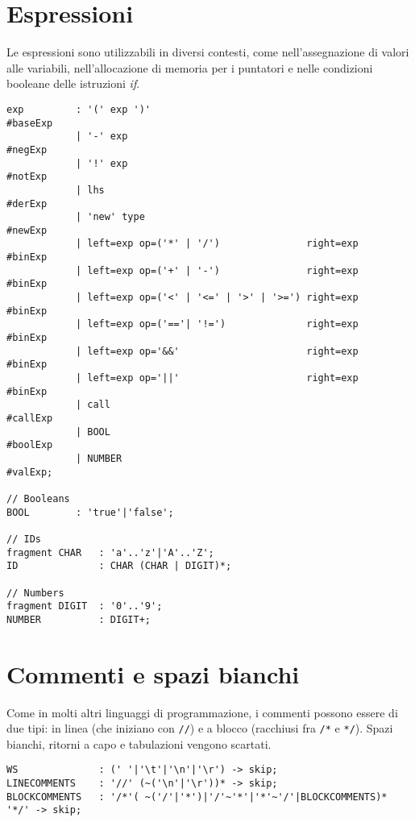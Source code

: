 \documentclass[../report.tex]{subfiles}
\begin{document}
\section{Espressioni}\label{s:espressioni}
Le espressioni sono utilizzabili in diversi contesti, come nell'assegnazione di valori alle variabili, nell'allocazione di memoria per i puntatori e nelle condizioni booleane delle istruzioni \textit{if}.
\begin{lstlisting}[style=antlr]
exp         : '(' exp ')'                                       #baseExp
            | '-' exp                                           #negExp
            | '!' exp                                           #notExp
            | lhs                                               #derExp
            | 'new' type                                        #newExp
            | left=exp op=('*' | '/')               right=exp   #binExp
            | left=exp op=('+' | '-')               right=exp   #binExp
            | left=exp op=('<' | '<=' | '>' | '>=') right=exp   #binExp
            | left=exp op=('=='| '!=')              right=exp   #binExp
            | left=exp op='&&'                      right=exp   #binExp
            | left=exp op='||'                      right=exp   #binExp
            | call                                              #callExp
            | BOOL                                              #boolExp
            | NUMBER                                            #valExp;

// Booleans
BOOL        : 'true'|'false';

// IDs
fragment CHAR   : 'a'..'z'|'A'..'Z';
ID              : CHAR (CHAR | DIGIT)*;

// Numbers
fragment DIGIT  : '0'..'9';
NUMBER          : DIGIT+;
\end{lstlisting}

\section{Commenti e spazi bianchi}\label{s:commenti-spazi-bianchi}
Come in molti altri linguaggi di programmazione, i commenti possono essere di due tipi: in linea (che iniziano con \verb|//|) e a blocco (racchiusi fra \verb|/*| e \verb|*/|). Spazi bianchi, ritorni a capo e tabulazioni vengono scartati.
\begin{lstlisting}[style=antlr]
WS              : (' '|'\t'|'\n'|'\r') -> skip;
LINECOMMENTS    : '//' (~('\n'|'\r'))* -> skip;
BLOCKCOMMENTS   : '/*'( ~('/'|'*')|'/'~'*'|'*'~'/'|BLOCKCOMMENTS)* '*/' -> skip;
\end{lstlisting}
\end{document}
